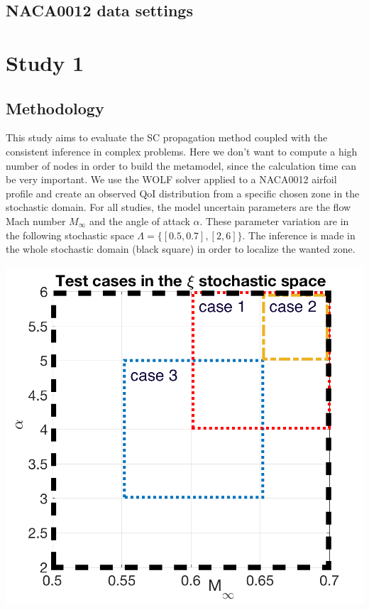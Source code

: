 \documentclass[11pt, a4paper, English]{report}
\begin{document}
\subsection{NACA0012 data settings}
\section{Study 1}
\subsection{Methodology}
\begin{minipage}{0.4\linewidth}
This study aims to evaluate the SC propagation method coupled with the consistent inference in complex problems. Here we don't want to compute a high number of nodes in order to build the metamodel, since the calculation time can be very important. We use the WOLF solver applied to a NACA0012 airfoil profile and create an observed QoI distribution from a specific chosen zone in the stochastic domain. For all studies, the model uncertain parameters are the flow Mach number $M_\infty$ and the angle of attack $\alpha$. These parameter variation are in the following stochastic space $\Lambda=\{[0.5, 0.7], [2,6]\}$. The inference is made in the whole stochastic domain (black square) in order to localize the wanted zone. 
\end{minipage}
\begin{minipage}{0.59\linewidth}
\includegraphics[width=\textwidth]{test_cases.png}

\end{minipage}
\end{document}

